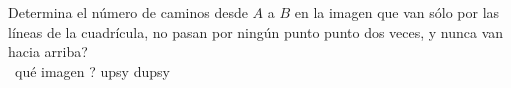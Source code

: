 Determina el número de caminos desde $A$ a $B$ en la imagen que van sólo por las líneas de la cuadrícula, no pasan por ningún punto
punto dos veces, y nunca van hacia arriba?
\\\ qué imagen ? upsy dupsy 
